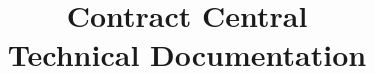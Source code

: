 \documentclass[a4paper,12pt]{report}
\begin{document}
\title{
    \textbf{Contract Central}\\
    Technical Documentation
}

\makeatletter
\def\@author{
    M1 Software Development \& Big Data -- ISEN Toulon\\
    \textbf{Academic Year:} 2024--2025\\
    \textbf{Team Members:}\\
    Capucine Debailleul (Project Manager)\\
    Alexis Dutaud\\
    Fabio Sintoni\\
    Larry Jason Tueno
}
\makeatother



\maketitle
\tableofcontents
\newpage



\end{document}
